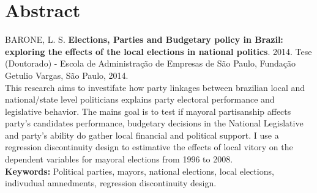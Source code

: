 \chapter*{Abstract}
\noindent BARONE, L. S. \textbf{Elections, Parties and Budgetary policy in Brazil: exploring the effects of the local elections in national politics}. 
2014. %
Tese (Doutorado) - Escola de Administração de Empresas de São Paulo,
Fundação Getulio Vargas, São Paulo, 2014.
\\


This research aims to investifate how party linkages between brazilian local and national/state level politicians explains party electoral performance and legislative behavior. The mains goal is to test if mayoral partisanship affects party's candidates performance, budgetary decisions in the National Legislative and party's ability do gather local financial and political support. I use a regression discontinuity design to estimative the effects of local vitory on the dependent variables for mayoral elections from 1996 to 2008.
\newline
\\


\noindent \textbf{Keywords:} Political parties, mayors, national elections, local elections, indivudual amnedments, regression discontinuity design.
